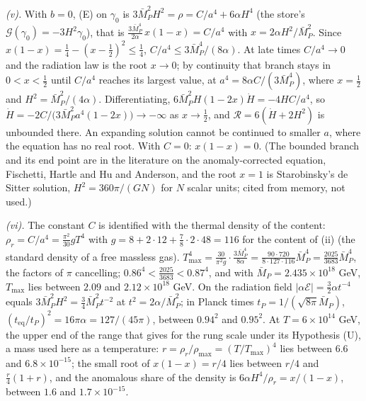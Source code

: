 \emph{(v).} With $b = 0$, (E) on $\gamma_{0}$ is $3\bar{M}_{P}^{2}H^{2} = \rho = C/a^{4} + 6\alpha H^{4}$ (the store's $\mathcal{G}(\gamma_{0}) = -3H^{2}\gamma_{0}$), that is $\tfrac{3\bar{M}_{P}^{4}}{2\alpha}\,x(1 - x) = C/a^{4}$ with $x = 2\alpha H^{2}/\bar{M}_{P}^{2}$. Since $x(1 - x) = \tfrac14 - (x - \tfrac12)^{2} \le \tfrac14$, $C/a^{4} \le 3\bar{M}_{P}^{4}/(8\alpha)$. At late times $C/a^{4} \to 0$ and the radiation law is the root $x \to 0$; by continuity that branch stays in $0 < x < \tfrac12$ until $C/a^{4}$ reaches its largest value, at $a^{4} = 8\alpha C/(3\bar{M}_{P}^{4})$, where $x = \tfrac12$ and $H^{2} = \bar{M}_{P}^{2}/(4\alpha)$. Differentiating, $6\bar{M}_{P}^{2}H(1 - 2x)\dot H = -4HC/a^{4}$, so $\dot H = -2C/\bigl(3\bar{M}_{P}^{2}a^{4}(1 - 2x)\bigr) \to -\infty$ as $x \to \tfrac12$, and $\mathcal{R} = 6(\dot H + 2H^{2})$ is unbounded there. An expanding solution cannot be continued to smaller $a$, where the equation has no real root. With $C = 0$: $x(1 - x) = 0$. (The bounded branch and its end point are in the literature on the anomaly-corrected equation, Fischetti, Hartle and Hu and Anderson, and the root $x = 1$ is Starobinsky's de Sitter solution, $H^{2} = 360\pi/(GN)$ for $N$ scalar units; cited from memory, not used.)

\emph{(vi).} The constant $C$ is identified with the thermal density of the content: $\rho_{r} = C/a^{4} = \tfrac{\pi^{2}}{30}gT^{4}$ with $g = 8 + 2 \cdot 12 + \tfrac78 \cdot 2 \cdot 48 = 116$ for the content of (ii) (the standard density of a free massless gas). $T_{\max}^{4} = \tfrac{30}{\pi^{2}g}\cdot\tfrac{3\bar{M}_{P}^{4}}{8\alpha} = \tfrac{90 \cdot 720}{8 \cdot 127 \cdot 116}\bar{M}_{P}^{4} = \tfrac{2025}{3683}\bar{M}_{P}^{4}$, the factors of $\pi$ cancelling; $0.86^{4} < \tfrac{2025}{3683} < 0.87^{4}$, and with $\bar{M}_{P} = 2.435 \times 10^{18}$ GeV, $T_{\max}$ lies between $2.09$ and $2.12 \times 10^{18}$ GeV. On the radiation field $|\alpha\mathcal{E}| = \tfrac32\alpha t^{-4}$ equals $3\bar{M}_{P}^{2}H^{2} = \tfrac34\bar{M}_{P}^{2}t^{-2}$ at $t^{2} = 2\alpha/\bar{M}_{P}^{2}$; in Planck times $t_{P} = 1/(\sqrt{8\pi}\bar{M}_{P})$, $(t_{\mathrm{eq}}/t_{P})^{2} = 16\pi\alpha = 127/(45\pi)$, between $0.94^{2}$ and $0.95^{2}$. At $T = 6 \times 10^{14}$ GeV, the upper end of the range that  gives for the rung scale under its Hypothesis (U), a mass used here as a temperature: $r = \rho_{r}/\rho_{\max} = (T/T_{\max})^{4}$ lies between $6.6$ and $6.8 \times 10^{-15}$; the small root of $x(1 - x) = r/4$ lies between $r/4$ and $\tfrac{r}{4}(1 + r)$, and the anomalous share of the density is $6\alpha H^{4}/\rho_{r} = x/(1 - x)$, between $1.6$ and $1.7 \times 10^{-15}$.
